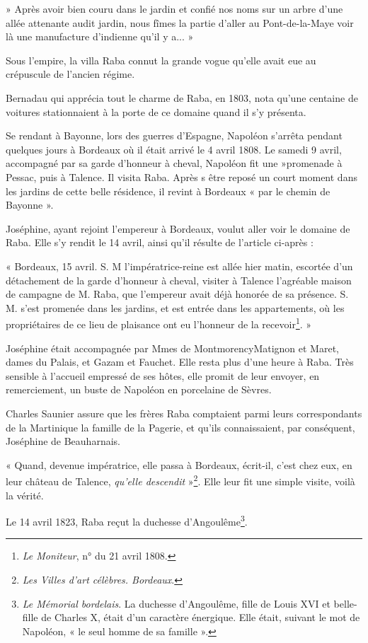 » Après avoir bien couru dans le jardin et confié nos noms sur un arbre d'une allée attenante audit jardin, nous fîmes la partie d'aller au Pont-de-la-Maye voir là une manufacture d'indienne qu'il y a... » 

Sous l'empire, la villa Raba connut la grande vogue qu'elle avait eue au crépuscule de l'ancien régime.

Bernadau qui apprécia tout le charme de Raba, en 1803, nota qu'une centaine de voitures stationnaient à la porte de ce domaine quand il s'y présenta.

Se rendant à Bayonne, lors des guerres d'Espagne, Napoléon s'arrêta pendant quelques jours à Bordeaux où il était arrivé le 4 avril 1808. Le samedi 9 avril, accompagné par sa garde d'honneur à cheval, Napoléon fit une »promenade à Pessac, puis à Talence. Il visita Raba. Après s être reposé un court moment dans les jardins de cette belle résidence, il revint à Bordeaux « par le chemin de Bayonne ».

Joséphine, ayant rejoint l'empereur à Bordeaux, voulut aller voir le domaine de Raba. Elle s'y rendit le 14 avril, ainsi qu'il résulte de l'article ci-après :

« Bordeaux, 15 avril. S. M l'impératrice-reine est allée hier matin, escortée d'un détachement de la garde d'honneur à cheval, visiter à Talence l'agréable maison de campagne de M. Raba, que l'empereur avait déjà honorée de sa présence. S. M. s'est promenée dans les jardins, et est entrée dans les appartements, où les propriétaires de ce lieu de plaisance ont eu l'honneur de la recevoir\footnote{\textit{Le Moniteur}, n° du 21 avril 1808.}. » 

Joséphine était accompagnée par Mmes de MontmorencyMatignon et Maret, dames du Palais, et Gazam et Fauchet. Elle resta plus d'une heure à Raba. Très sensible à l'accueil empressé de ses hôtes, elle promit de leur envoyer, en remerciement, un buste de Napoléon en porcelaine de Sèvres.

Charles Saunier assure que les frères Raba comptaient parmi leurs correspondants de la Martinique la famille de la Pagerie, et qu'ils connaissaient, par conséquent, Joséphine de Beauharnais.

« Quand, devenue impératrice, elle passa à Bordeaux, écrit-il, c'est chez eux, en leur château de Talence, \textit{qu'elle descendit} »\footnote{\textit{Les Villes d'art célèbres. Bordeaux}.}. Elle leur fit une simple visite, voilà la vérité.

Le 14 avril 1823, Raba reçut la duchesse d'Angoulême\footnote{\textit{Le Mémorial bordelais}. La duchesse d'Angoulême, fille de Louis XVI et belle-fille de Charles X, était d'un caractère énergique. Elle était, suivant le mot de Napoléon, « le seul homme de sa famille ».}.

